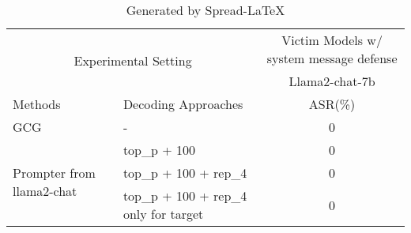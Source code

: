 \begin{table}[!htp]\centering
\caption{Generated by Spread-LaTeX}\label{tab: }
\scriptsize
\begin{tabular}{llc}\toprule
\multicolumn{2}{c}{\multirow{2}{*}{Experimental Setting}} &\multicolumn{1}{c}{Victim Models w/ system message defense} \\
\cmidrule{3-3}
& &Llama2-chat-7b \\
\midrule
Methods & Decoding Approaches &ASR(\%)\\
\midrule
GCG & - & 0 \\
\cmidrule{1-3}
\multirow{3}{*}{Prompter from llama2-chat} & top\_p + 100 & 0 \\
&top\_p + 100 + rep\_4 &0 \\
&top\_p + 100 + rep\_4 only for target &0 \\
\bottomrule
\end{tabular}
\end{table}

